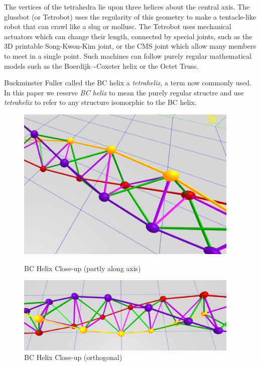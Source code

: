 \documentclass[review]{siamonline1116}
\begin{document}
The vertices of the tetrahedra lie upon
three helices about the central axis.
The glussbot\cite{readglussbot} (or Tetrobot)\cite{TetrobotBook} uses the regularity of
this geometry to make a tentacle-like robot that can crawl like a slug
or mollusc.  The Tetrobot uses mechanical actuators which can change their length, connected by special joints,
such as the 3D printable Song-Kwon-Kim\cite{song2003spherical} joint, or the CMS joint\cite{HamlinSandersonCMS}
which allow many members to meet in a single point.
Such machines can
follow purely regular mathematical models such as the Boerdijk–-Coxeter
helix or the Octet Truss\cite{richard1961synergetic}.

Buckminster Fuller called the BC helix a \emph{tetrahelix}\cite{fuller1982synergetics},
a term now commonly used. In this paper we reserve \emph{BC helix} to mean the purely regular structre and use \emph{tetrahelix} to refer
to any structure isomorphic to the BC helix.



\begin{figure}[H]
  \centering
     \includegraphics[width=0.95\textwidth]{figures/BCHelixCloseUp.png}
     \caption{BC Helix Close-up (partly along axis)}
  \centering
     \includegraphics[width=0.95\textwidth]{figures/VerticalCloseUp.png}
     \caption{BC Helix Close-up (orthogonal)}
  \label{fig:closeup}
\end{figure}
\end{document}
